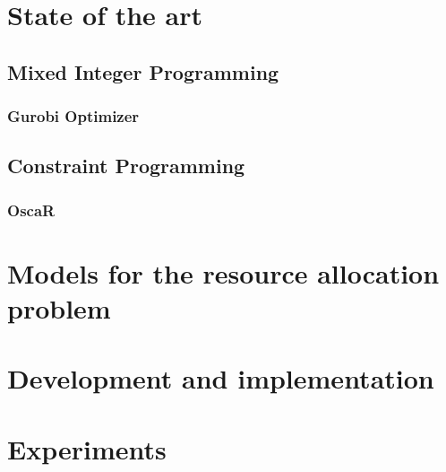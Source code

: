 \documentclass[twoside]{template/EPL-master-thesis-covers-EN}
\begin{document}
  \chapter{State of the art}
  \label{chapter:sota}

  

  \section{Mixed Integer Programming}
  

  \subsection{Gurobi Optimizer}
  \label{subsection:gurobi}
  

  \section{Constraint Programming}
  

  \subsection{OscaR}
  \label{subsection:oscar}
  
  
  \chapter{Models for the resource allocation problem}
  \label{chapter:models}

  
  
  

  \chapter{Development and implementation}
  \label{chapter:implementation}
  


  \chapter{Experiments}
  \label{chapter:experiments}
  
  
\end{document}
